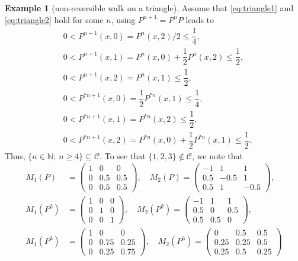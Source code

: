 \documentclass[12pt,a4]{amsart}
\numberwithin{equation}{section}
\theoremstyle{plain}
\theoremstyle{definition}
\newtheorem{example}{Example}[section]
\theoremstyle{remark}
\let\oldendproof\endproof
\renewenvironment{proof}[1][\proofname]{%
  \oldproof[\noindent\textbf{#1.} ]%
}{\oldendproof}
\newcommand{\1}{\mathds{1}}
\renewcommand{\leq}{\leqslant}
\renewcommand{\geq}{\geqslant}
\begin{document}
\begin{example}[non-reversible walk on a triangle]
\begin{proof}
		Assume that \eqref{eq:triangle1} and \eqref{eq:triangle2} hold for some $n$, using $P^{n+1} = P^n P$ leads to
		\begin{align*}
		&0 < P^{n+1}(x,0) = P^n(x,2)/2 \leq \dfrac{1}{4}, \\
		&0 < P^{n+1}(x,1) = P^n(x,0) + \dfrac{1}{2} P^n(x,2) \leq \dfrac{1}{2}, \\ 
		&0 < P^{n+1}(x,2) = P^n(x,1) \leq \dfrac{1}{2},  \\
		&0 < P^{*n+1}(x,0) = \dfrac{1}{2}P^{*n}(x,1) \leq \dfrac{1}{4}, \\
		&0 < P^{*n+1}(x,1) = P^{*n}(x,2) \leq \dfrac{1}{2}, \\
		&0 < P^{*n+1}(x,2) = P^{*n}(x,0) + \dfrac{1}{2} P^{*n}(x,1) \leq \dfrac{1}{2}. 
		\end{align*}
		Thus, $\{n \in \mathbb{N};~n \geq 4\} \subseteq \mathcal{C}$. To see that $\{1,2,3\} \notin \mathcal{C}$, we note that
		\begin{align*}
		M_1(P) &= \begin{pmatrix} 
		1 & 0 & 0 \\ 
		0 & 0.5 & 0.5 \\ 
		0 & 0.5 & 0.5  
		\end{pmatrix}, \quad M_2(P) = \begin{pmatrix} 
		-1 & 1 & 1 \\ 
		0.5 & -0.5 & 1 \\ 
		0.5 & 1 & -0.5  
		\end{pmatrix}, \\
		M_1(P^2) &= \begin{pmatrix} 
		1 & 0 & 0 \\ 
		0 & 1 & 0 \\ 
		0 & 0 & 1  
		\end{pmatrix}, \quad M_2(P^2) = \begin{pmatrix} 
			-1 & 1 & 1 \\ 
		0.5 & 0 & 0.5 \\ 
		0.5 & 0.5 & 0  
		\end{pmatrix}, \\
		M_1(P^3) &= \begin{pmatrix} 
		1 & 0 & 0 \\ 
		0 & 0.75 & 0.25 \\ 
		0 & 0.25 & 0.75  
		\end{pmatrix}, \quad M_2(P^3) = \begin{pmatrix} 
		0 & 0.5 & 0.5 \\ 
		0.25 & 0.25 & 0.5 \\ 
		0.25 & 0.5 & 0.25  

\end{pmatrix}
\end{align*}
\end{proof}
\end{example}
\end{document}
